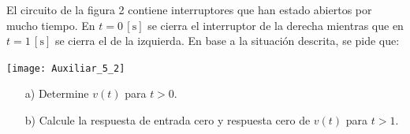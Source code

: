 \documentclass[
  11pt,
  letterpaper,
   addpoints,
   answers
  ]{exam}
\begin{document}
\begin{questions}
    \question 
    El circuito de la figura 2 contiene interruptores que han estado abiertos por mucho tiempo. En \( t = 0\,[\text{s}] \) se cierra el interruptor de la derecha mientras que en \( t = 1\,[\text{s}] \) se cierra el de la izquierda. En base a la situación descrita, se pide que:
    \begin{center}
        \texttt{[image: Auxiliar\_5\_2]}
    \end{center}

    \begin{enumerate}
        \item[a)] Determine \( v(t) \) para \( t > 0 \).
    
        \item[b)] Calcule la respuesta de entrada cero y respuesta cero de \( v(t) \) para \( t > 1 \).
    

\end{enumerate}
\end{questions}
\end{document}
